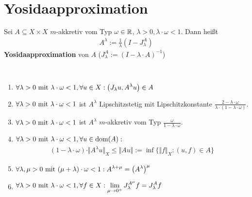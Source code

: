 \section{Yosidaapproximation}
\begin{definition}
	Sei $A\subseteq X\times X$ $m$-akkretiv vom Typ $\omega\in\R$, $\lambda>0,\lambda\cdot\omega<1$.
	Dann heißt
	\begin{align*}
		A^\lambda:=\frac{1}{\lambda}\left(I-J_\lambda^A\right)
	\end{align*}
	\textbf{Yosidaapproximation} von $A$ ($J_\lambda^A:=(I-\lambda\cdot A)^{-1}$)
\end{definition}

\begin{theorem}\
	\begin{enumerate}[label=(\alph*)]
		\item $\begin{aligned}
			\forall\lambda>0\mit\lambda\cdot\omega<1,\forall u\in X:\big(J_\lambda u,A^\lambda u\big)\in A
		\end{aligned}$
		\item $\begin{aligned}
			\forall\lambda>0\mit\lambda\cdot\omega<1
		\end{aligned}$ ist $A^\lambda$ Lipschitzstetig mit Lipschitzkonstante $\frac{2-\lambda\cdot\omega}{\lambda\cdot(1-\lambda\cdot\omega)}$.
		\item $\forall\lambda>0\mit\lambda\cdot\omega<1$ ist $A^\lambda$ $m$-akkretiv vom Typ $\frac{\omega}{1-\lambda\cdot\omega}$.
		\item $\begin{aligned}
			\forall\lambda>0\mit\lambda\cdot\omega<1,\forall u\in\dom(A):			
		\end{aligned}$
		\begin{align*}
			(1-\lambda\cdot\omega)\cdot\Vert A^\lambda u\Vert_X\leq\Vert A u\Vert:=\inf\big\lbrace\Vert f\Vert_X:(u,f)\in A\big\rbrace
		\end{align*}
		\item $\begin{aligned}
			\forall\lambda,\mu>0\mit(\mu+\lambda)\cdot\omega<1:
			A^{\lambda+\mu}=\big(A^\lambda\big)^\mu
		\end{aligned}$
		\item $\begin{aligned}
			\forall\lambda>0\mit\lambda\cdot\omega<1,\forall f\in X:
			\lim\limits_{\mu\to0^+}J_\lambda^{A^\mu}f=J_\lambda^A f
		\end{aligned}$
	\end{enumerate}
\end{theorem}

